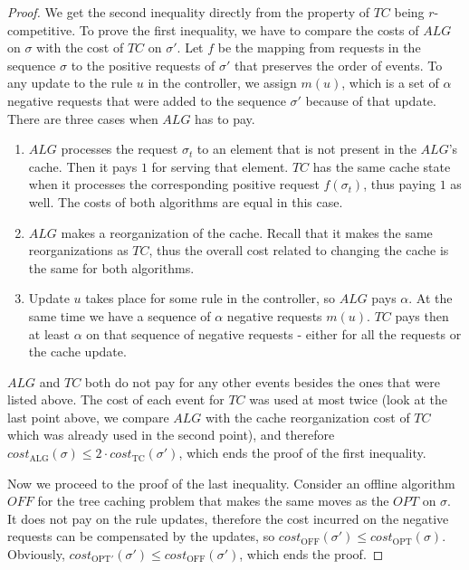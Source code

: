 \begin{proof} We get the second inequality directly from the property of $TC$
being $r$-competitive. To prove the first inequality, we have to compare the
costs of $ALG$ on $\sigma$ with the cost of $TC$ on $\sigma'$. Let $f$ be the
mapping from requests in the sequence $\sigma$ to the positive requests of
$\sigma'$ that preserves the order of events. To any update to the 
rule $u$ in the controller, we assign $m(u)$, which is a set of $\alpha$ negative
requests that were added to the sequence $\sigma'$ because of that update. There
are three cases when $ALG$ has to pay. \begin{enumerate} \item $ALG$ processes
the request $\sigma_t$ to an element that is not present in the $ALG$'s cache.
Then it pays $1$ for serving that element. $TC$ has the same cache state when it
processes the corresponding positive request $f(\sigma_t)$, thus paying $1$ as well.
The costs of both algorithms are equal in this case. \item $ALG$ makes a
reorganization of the cache. Recall that it makes the same reorganizations as
$TC$, thus the overall cost related to changing the cache is the same for both
algorithms. \item Update $u$ takes place for some rule in the controller, so
$ALG$ pays $\alpha$. At the same time we have a sequence of $\alpha$ negative
requests $m(u)$. $TC$ pays then at least $\alpha$ on that sequence of negative requests - either for
all the requests or the cache update. 
\end{enumerate}
$ALG$ and $TC$ both do not pay for any
other events besides the ones that were listed above. The cost of each event for $TC$ was used
at most twice (look at the last point above, we compare $ALG$ with the cache
reorganization cost of $TC$ which was already used in the second point), and
therefore $cost_{\mathrm{ALG}}(\sigma)
\leq 2 \cdot cost_{\mathrm{TC}}(\sigma')$, which ends the proof of the first inequality.

Now we proceed to the proof of the last inequality. Consider an
offline algorithm $OFF$ for the tree caching problem that makes the same moves as
the $OPT$ on $\sigma$. It does not pay on the rule updates, therefore the cost
incurred on the negative requests can be compensated by the updates, so
$cost_{\mathrm{OFF}}(\sigma') \leq cost_{\mathrm{OPT}}(\sigma)$. Obviously,
$cost_{\mathrm{OPT'}}(\sigma')
\leq cost_{\mathrm{OFF}}(\sigma')$, which ends the proof. \end{proof}
